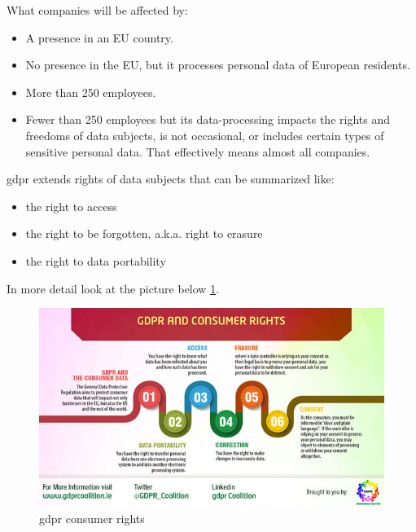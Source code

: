 \documentclass[thesis=M,english]{FITthesis}[2012/06/26]
\begin{document}
What companies will be affected by:
\begin{itemize}[nosep]
	\item A presence in an EU country.
	\item No presence in the EU, but it processes personal data of European residents.
	\item More than 250 employees.
	\item Fewer than 250 employees but its data-processing impacts the rights and freedoms of data subjects, is not occasional, or includes certain types of sensitive personal data. That effectively means almost all companies.\\
\end{itemize}

\acrshort{gdpr} extends rights of data subjects that can be summarized like:
\begin{itemize}[nosep]
\item the right to access
\item the right to be forgotten, a.k.a. right to erasure
\item the right to data portability\\
\end{itemize}

In more detail look at the picture below \ref{fig:gdpr_subject_rights}.
\begin{figure}[h!]\centering
	\includegraphics[width=1\textwidth]{pictures/gdpr_subject_rights}
	\caption{\acrshort{gdpr} consumer rights \cite{gdpr_subject_rights}}\label{fig:gdpr_subject_rights}
\end{figure}
\end{document}
